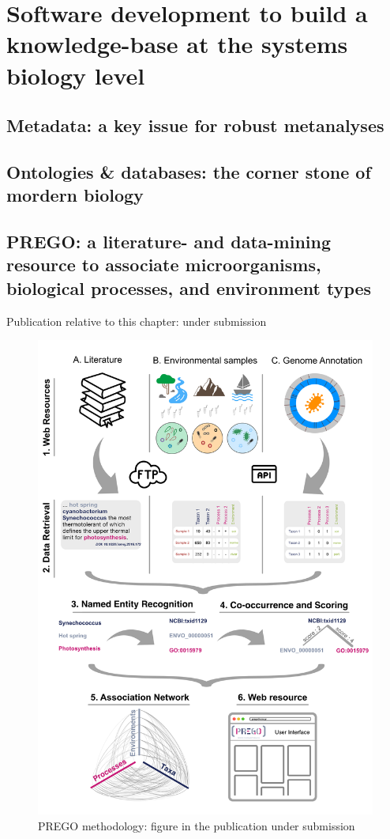 % 
% 


\chapter{Software development to build a knowledge-base at the systems biology level}
\label{cha:prego}


\section{Metadata: a key issue for robust metanalyses}

\section{Ontologies \& databases: the corner stone of mordern biology}

\newpage

\section{PREGO: a literature- and data-mining resource to associate microorganisms, biological processes, and environment types}

Publication relative to this chapter: under submission

\begin{figure}[!htbp]
   \centering
   \includegraphics[width=0.85\columnwidth]{figures/prego_analysis.png}
   \caption{PREGO methodology: figure in the publication under submission}
\end{figure}



